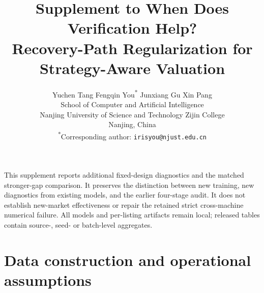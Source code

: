 \documentclass[11pt]{article}
\title{Supplement to When Does Verification Help?\\Recovery-Path Regularization for Strategy-Aware Valuation}
\author{Yuchen Tang \quad Fengqin You\textsuperscript{*} \quad Junxiang Gu \quad Xin Pang\\[.5em]
\small School of Computer and Artificial Intelligence\\
\small Nanjing University of Science and Technology Zijin College\\
\small Nanjing, China\\[.4em]
\small \textsuperscript{*}Corresponding author: \texttt{irisyou@njust.edu.cn}}
\date{}
\begin{document}
\maketitle
This supplement reports additional fixed-design diagnostics and the matched
stronger-gap comparison. It preserves the distinction between new training,
new diagnostics from existing models, and the earlier four-stage audit.
It does not establish new-market effectiveness or repair the retained strict
cross-machine numerical failure. All models and per-listing artifacts remain
local; released tables contain source-, seed- or batch-level aggregates.

\section{Data construction and operational assumptions}
\end{document}
